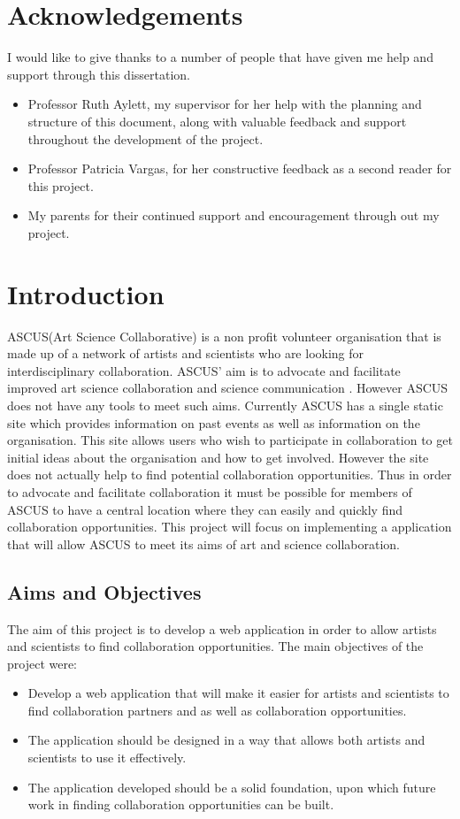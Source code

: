 \documentclass[a4paper,oneside,11pt]{report}
\begin{document}
\chapter*{Acknowledgements}%
%
I would like to give thanks to a number of people that have given me help and support through this dissertation. 
\begin{itemize}
 \item Professor Ruth Aylett, my supervisor for her help with the planning and structure of this document, along with valuable feedback and support throughout the development of the project. 
  \item Professor Patricia Vargas, for her constructive feedback as a second reader for this project. 
  \item My parents for their continued support and encouragement through out my project.
\end{itemize}



\chapter{Introduction}
ASCUS(Art Science Collaborative) is a non profit volunteer organisation that is made up of a network of artists and scientists who are looking for interdisciplinary collaboration. ASCUS' aim is to advocate and facilitate improved art science collaboration and science communication \autocite{ascus}. However ASCUS does not have any tools  to meet such aims. Currently ASCUS has a single static site which provides information on past events as well as information on the organisation. This site allows users who wish to participate in collaboration to get initial ideas about the organisation and how to get involved. However the site does not actually help to find potential collaboration opportunities. Thus in order to advocate and facilitate collaboration it must be possible for members of ASCUS to have a central location where they can easily and quickly find collaboration opportunities. This project will focus on implementing a application that will allow ASCUS to meet its aims of art and science collaboration.

\pagebreak
\section{Aims and Objectives} 	
The aim of this project is to develop a web application in order to allow artists and scientists to find collaboration opportunities.
The main objectives of the project were:
\begin{itemize}
	\item Develop a web application that will make it easier for artists and scientists to find collaboration partners and as well as collaboration opportunities.
	\item The application should be designed in a way that allows both artists and scientists to use it effectively.
	\item The application developed should be a solid foundation, upon which future work in finding collaboration opportunities can be built.
\end{itemize}
	
\end{document}
